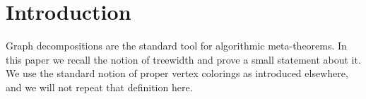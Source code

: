 \section{Introduction}

Graph decompositions are the standard tool for algorithmic meta-theorems.
In this paper we recall the notion of treewidth and prove a small statement
about it.  We use the standard notion of
proper vertex colorings
as introduced elsewhere, and we will not repeat that definition here.




